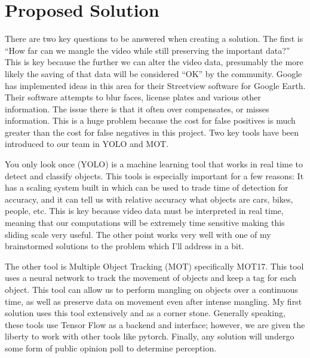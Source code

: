 \documentclass[journal,draftclsnofoot,onecolumn]{IEEEtran}
\begin{document}
    
    
    
    \section{Proposed Solution}
    There are two key questions to be answered when creating a solution. The 
    first is “How far can we mangle the video while still preserving the 
    important data?” This is key because the further we can alter the video 
    data, presumably the more likely the saving of that data will be considered 
    “OK” by the community. Google has implemented ideas in this area for their 
    Streetview software for Google Earth. Their software attempts to blur faces, 
    license plates and various other information. The issue there is that it 
    often over compensates, or misses information. This is a huge problem 
    because the cost for false positives is much greater than the cost for 
    false negatives in this project. Two key tools have been introduced to our 
    team in YOLO and MOT.

    You only look once (YOLO) is a machine learning tool that works in real 
    time to detect and classify objects. This tools is especially important 
    for a few reasons: It has a scaling system built in which can be used 
    to trade time of detection for accuracy, and it can tell us with 
    relative accuracy what objects are cars, bikes, people, etc. This is 
    key because video data must be interpreted in real time, meaning that 
    our computations will be extremely time sensitive making this sliding 
    scale very useful. The other point works very well with one of my 
    brainstormed solutions to the problem which I’ll address in a bit. 
    
    The other tool is Multiple Object Tracking (MOT) specifically MOT17. 
    This tool uses a neural network to track the movement of objects and 
    keep a tag for each object. This tool can allow us to perform mangling 
    on objects over a continuous time, as well as preserve data on movement 
    even after intense mangling. My first solution uses this tool 
    extensively and as a corner stone. Generally speaking, these tools use 
    Tensor Flow as a backend and interface; however, we are given the 
    liberty to work with other tools like pytorch.  Finally, any solution 
    will undergo some form of public opinion poll to determine perception.
    
\end{document}
